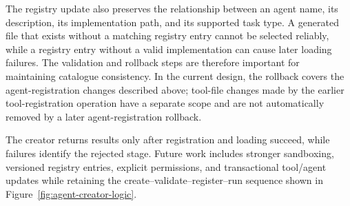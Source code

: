 The registry update also preserves the relationship between an agent name, its description, its implementation path, and its supported task type. A generated file that exists without a matching registry entry cannot be selected reliably, while a registry entry without a valid implementation can cause later loading failures. The validation and rollback steps are therefore important for maintaining catalogue consistency. In the current design, the rollback covers the agent-registration changes described above; tool-file changes made by the earlier tool-registration operation have a separate scope and are not automatically removed by a later agent-registration rollback.

The creator returns results only after registration and loading succeed, while failures identify the rejected stage. Future work includes stronger sandboxing, versioned registry entries, explicit permissions, and transactional tool/agent updates while retaining the create--validate--register--run sequence shown in Figure~\ref{fig:agent-creator-logic}.

